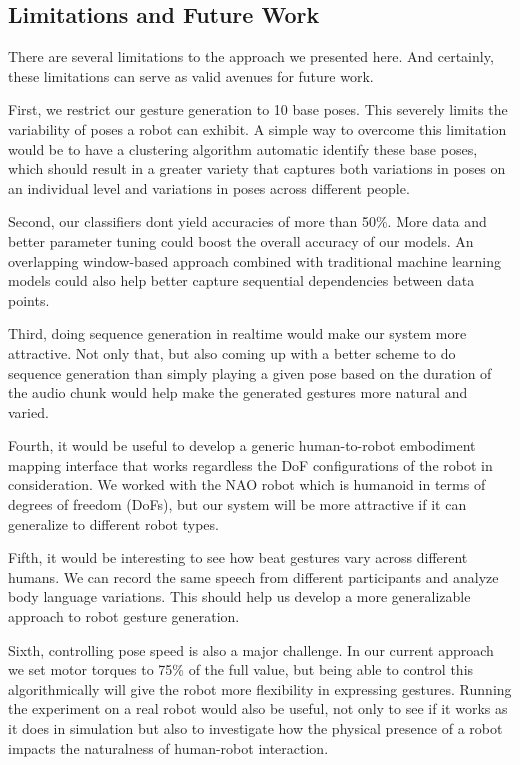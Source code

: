 \subsection{Limitations and Future Work}
There are several limitations to the approach we presented here. And certainly, these limitations can serve as valid avenues for future work.

First, we restrict our gesture generation to 10 base poses. This severely limits the variability of poses a robot can exhibit. A simple way to overcome this limitation would be to have a clustering algorithm automatic identify these base poses, which should result in a greater variety that captures both variations in poses on an individual level and variations in poses across different people.

Second, our classifiers don\textquotesingle t yield accuracies of more than 50\%. More data and better parameter tuning could boost the overall accuracy of our models. An overlapping window-based approach combined with traditional machine learning models could also help better capture sequential dependencies between data points.

Third, doing sequence generation in realtime would make our system more attractive. Not only that, but also coming up with a better scheme to do sequence generation than simply playing a given pose based on the duration of the audio chunk would help make the generated gestures more natural and varied.

Fourth, it would be useful to develop a generic human-to-robot embodiment mapping interface that works regardless the DoF configurations of the robot in consideration. We worked with the NAO robot which is humanoid in terms of degrees of freedom (DoFs), but our system will be more attractive if it can generalize to different robot types.

Fifth, it would be interesting to see how beat gestures vary across different humans. We can record the same speech from different participants and analyze body language variations. This should help us develop a more generalizable approach to robot gesture generation.

Sixth, controlling pose speed is also a major challenge. In our current approach we set motor torques to 75\% of the full value, but being able to control this algorithmically will give the robot more flexibility in expressing gestures. Running the experiment on a real robot would also be useful, not only to see if it works as it does in simulation but also to investigate how the physical presence of a robot impacts the naturalness of human-robot interaction.

